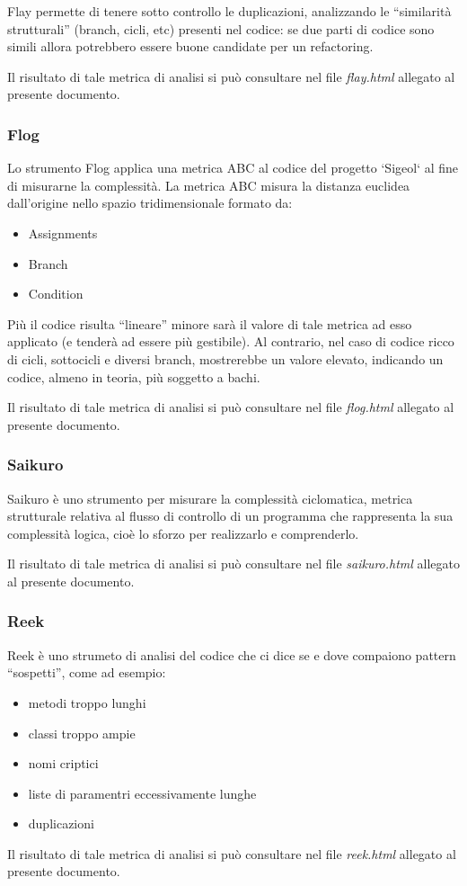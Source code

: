 \documentclass[11pt,a4paper]{article}
\begin{document}
Flay permette di tenere sotto controllo le duplicazioni, analizzando le “similarità strutturali” (branch, cicli, etc) presenti nel codice: se due parti di codice sono simili allora potrebbero essere buone candidate per un refactoring.

Il risultato di tale metrica di analisi si può consultare nel file \textit{flay.html} allegato al presente documento.
\subsubsection{Flog}
Lo strumento Flog applica una metrica ABC al codice del progetto `Sigeol` al fine di misurarne la complessità.
La metrica ABC misura la distanza euclidea dall’origine nello spazio tridimensionale formato da:
\begin{itemize}
 \item Assignments
 \item Branch
 \item Condition
\end{itemize}
Più il codice risulta “lineare” minore sarà il valore di tale metrica ad esso applicato (e tenderà ad essere più gestibile). Al contrario, nel caso di codice ricco di cicli, sottocicli e diversi branch, mostrerebbe un valore elevato, indicando un codice, almeno in teoria, più soggetto a bachi.

Il risultato di tale metrica di analisi si può consultare nel file \textit{flog.html} allegato al presente documento.
\subsubsection{Saikuro}
Saikuro è uno strumento per misurare la complessità ciclomatica, metrica strutturale relativa al flusso di controllo di un programma che rappresenta la sua complessità logica, cioè lo sforzo per realizzarlo e comprenderlo.

Il risultato di tale metrica di analisi si può consultare nel file \textit{saikuro.html} allegato al presente documento.
\subsubsection{Reek}
Reek è uno strumeto di analisi del codice che ci dice se e dove compaiono pattern “sospetti”, come ad esempio:
\begin{itemize}
 \item metodi troppo lunghi
 \item classi troppo ampie
 \item nomi criptici
 \item liste di paramentri eccessivamente lunghe
 \item duplicazioni
\end{itemize}
Il risultato di tale metrica di analisi si può consultare nel file \textit{reek.html} allegato al presente documento.
\end{document}
